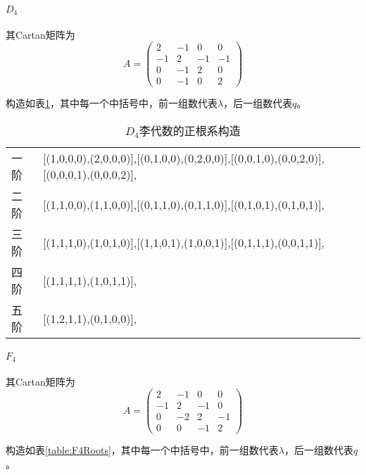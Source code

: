 \documentclass{ctexart}
\begin{document}
	
	
	\paragraph{$D_4$} 其Cartan矩阵为
	\begin{equation}
	A=
	\begin{pmatrix}
	2 & -1 & 0 & 0\\
	-1 & 2 & -1 & -1 \\
	0 & -1 & 2 & 0 \\
	0 & -1 & 0 & 2
	\end{pmatrix}
	\end{equation}
	
	构造如表\ref{table:D4Roots}，其中每一个中括号中，前一组数代表$\lambda$，后一组数代表$q$。
	
	\begin{table}[!htbp]
		\centering
		\begin{tabular}{ll}
			一阶 & [(1,0,0,0),(2,0,0,0)],[(0,1,0,0),(0,2,0,0)],[(0,0,1,0),(0,0,2,0)],[(0,0,0,1),(0,0,0,2)], \\
			二阶 & [(1,1,0,0),(1,1,0,0)],[(0,1,1,0),(0,1,1,0)],[(0,1,0,1),(0,1,0,1)], \\
			三阶 & [(1,1,1,0),(1,0,1,0)],[(1,1,0,1),(1,0,0,1)],[(0,1,1,1),(0,0,1,1)], \\
			四阶 & [(1,1,1,1),(1,0,1,1)], \\
			五阶 & [(1,2,1,1),(0,1,0,0)], \\
		\end{tabular}
		\caption{$D_4$李代数的正根系构造}
		\label{table:D4Roots}
	\end{table}

	
	
	\paragraph{$F_4$} 其Cartan矩阵为
	\begin{equation}
	A=
	\begin{pmatrix}
	2 & -1 & 0 & 0\\
	-1 & 2 & -1 & 0 \\
	0 & -2 & 2 & -1 \\
	0 & 0 & -1 & 2
	\end{pmatrix}
	\end{equation}
	
	构造如表\ref{table:F4Roots}，其中每一个中括号中，前一组数代表$\lambda$，后一组数代表$q$。
	
\end{document}
